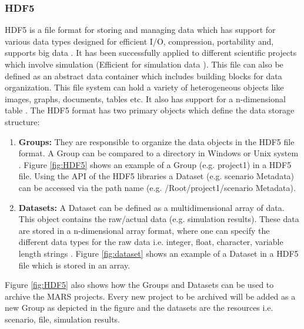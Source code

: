 \subsubsection{HDF5}
HDF5 is a file format for storing and managing data which has support for various data types designed for
efficient I/O, compression, portability and, supports big data \cite{HDF5}. It has been successfully applied to different scientific projects which
involve simulation (Efficient
for simulation data \cite[p.~11]{Savic2007}). This file can also be defined as an abstract data container which includes building blocks for data organization. 
This file system can hold a variety of heterogeneous objects like images, graphs, documents, tables etc. It also has support for a n-dimensional table  \cite[p.~2]{HDF5}. 
The HDF5 format has two primary objects which define the data storage structure:
\begin{enumerate}
    \item \textbf{Groups:}  They are responsible to organize the data objects in the HDF5 file format. A Group can be compared to a directory 
    in Windows or Unix system \cite{HDF5}. Figure \ref{fig:HDF5} shows an example of a Group (e.g. project1) in a HDF5 file. Using the API of the HDF5 libraries a Dataset 
    (e.g. scenario Metadata) can be accessed via the path name (e.g. /Root/project1/scenario Metadata).
    \item \textbf{Datasets:} A Dataset can be defined as a multidimensional array of data. This object contains the raw/actual data (e.g. simulation results).
    These data are stored in a n-dimensional array format, where 
    one can specify the different data types for the raw data i.e. integer, float, character, variable length strings \cite{HDF5}. Figure \ref{fig:dataset} shows
    an example of a Dataset in a HDF5 file which is stored in an array.
\end{enumerate}

Figure \ref{fig:HDF5} also shows how the Groups and Datasets can be used to archive the MARS projects. Every new project to be archived will be added as a new Group
as depicted in the figure and the datasets are the resources i.e. scenario, file, simulation results. 


